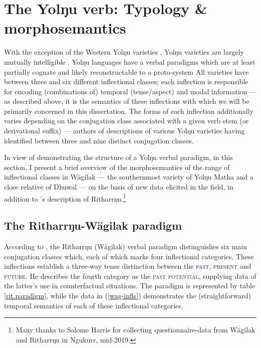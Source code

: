\section{The Yolŋu verb: Typology \& morphosemantics}\label{yol-paradigms}

With the exception of the Western Yolŋu varieties \citetext{\textit{i.e.}, Djinaŋ \& Djinba, see \citealp{Schebeck2001,Waters1989}}, Yolŋu varieties are largely mutually intelligible \citep{Heath1981b,Morphy1983}. Yolŋu languages have a verbal paradigms which are at least partially cognate and likely reconstructable to a proto-system \citetext{\citealp{Schebeck2001}, \citealp[see comparative reconstruction pilot work by ][]{Bowern2009}.} All varieties have between three and six different inflectional classes; each inflection is responsible for encoding (combinations of) temporal (tense/aspect) and modal information --- as described above, it is the semantics of these inflections with which we will be primarily concerned in this dissertation. The forms of each inflection additionally varies depending on the conjugation class associated with a given verb stem (or derivational suffix) --- authors of descriptions of various Yolŋu varieties having identified between three \citetext{\citealp[\textit{e.g.},][]{Waters1989} on Djinba \& Djinba} and nine \citetext{\citealp[\textit{e.g.},][]{Lowe1996} on Gupapuyŋu} distinct conjugation classes.

In view of demonstrating the structure of a Yolŋu verbal paradigm, in this section, I present a brief overview of the morphosemantics of the range of inflectional classes in Wägilak --- the southernmost variety of Yolŋu Matha and a close relative of Dhuwal --- on the basis of new data elicited in the field, in addition to \citeauthor{Heath1980r}'s \citeyearpar{Heath1980r} description of Ritharrŋu.\footnote{Many thanks to Salome Harris for collecting questionnaire-data from Wägilak and Ritharrŋu in Ngukurr, mid-2019.}

\subsection{The Ritharrŋu-Wägilak paradigm}\label{sec:rit.paradigm}

According to \citet[60--75]{Heath1980r}, the Ritharrŋu (Wägilak) verbal paradigm distinguishes six main conjugation classes which, each of which marks four inflectional categories. These inflections establish a three-way tense distinction between the \textcolor{blue}{\textsc{past}}, \textcolor{forest}{\textsc{present}} and \textcolor{ochre}{\textsc{future}}. He describes the fourth category as the \textcolor{purple}{\textsc{past potential}}, supplying data of the latter's use in counterfactual situations. The paradigm is represented by table \ref{rit.paradigm}, while the data in (\ref{wag-infls}) demonstrates the (straightforward) temporal semantics of each of these inflectional categories.


